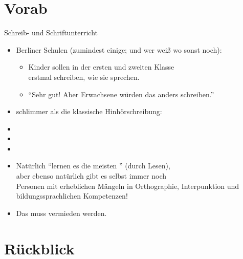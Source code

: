 
\section{Vorab}

\begin{frame}
  {Schreib- und Schriftunterricht}
  \pause
  \begin{itemize}[<+->]
    \item Berliner Schulen (zumindest einige; und wer weiß wo sonst noch):
      \begin{itemize}[<+->]
        \item Kinder sollen in der ersten und zweiten Klasse\\
          erstmal schreiben, wie sie sprechen.
        \item \alert{"`Sehr gut! Aber Erwachsene würden das anders schreiben."'}
      \end{itemize}
      \Halbzeile
    \item schlimmer als die klassische \alert{Hinhörschreibung}:\\
      \Halbzeile
    \item {}
    \item {}
    \item {}
    \Halbzeile
    \item Natürlich "`lernen es die meisten "' (durch Lesen),\\
      aber ebenso natürlich gibt es selbst  immer noch\\
      Personen mit erheblichen Mängeln in Orthographie, Interpunktion und\\
      bildungssprachlichen Kompetenzen!
    \item \alert{Das muss}  \alert{vermieden werden.}
  \end{itemize}
\end{frame}

\section{Rückblick}

